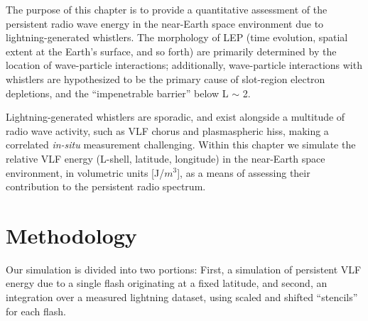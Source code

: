 The purpose of this chapter is to provide a quantitative assessment of the persistent radio wave energy in the near-Earth space environment due to lightning-generated whistlers. The morphology of LEP (time evolution, spatial extent at the Earth's surface, and so forth) are primarily determined by the location of wave-particle interactions; additionally, wave-particle interactions with whistlers are hypothesized to be the primary cause of slot-region electron depletions, and the ``impenetrable barrier'' below L $\sim$ 2.

Lightning-generated whistlers are sporadic, and exist alongside a multitude of radio wave activity, such as VLF chorus and plasmaspheric hiss, making a correlated \emph{in-situ} measurement challenging. Within this chapter we simulate the relative VLF energy (L-shell, latitude, longitude) in the near-Earth space environment, in volumetric units [J/$m^3$], as a means of assessing their contribution to the persistent radio spectrum.


\section{Methodology}
Our simulation is divided into two portions: First, a simulation of persistent VLF energy due to a single flash originating at a fixed latitude, and second, an integration over a measured lightning dataset, using scaled and shifted ``stencils'' for each flash.

